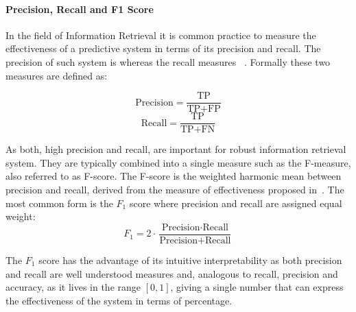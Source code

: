 \cite[Chapter 8.3, p.~155]{Manning:2008aa}

\paragraph{Precision, Recall and F1 Score}
\label{par:Precision, Recall and F1 Score}

In the field of Information Retrieval it is common practice to measure the effectiveness of a predictive system in terms of its precision and recall.
The precision of such system is  whereas the recall measures ~\cite{Rijsbergen:1979aa}. Formally these two measures are defined as:

\begin{equation}
    \text{Precision} = \frac{\text{TP}}{\text{TP} + \text{FP}}
\end{equation}
\begin{equation}
    \text{Recall} = \frac{\text{TP}}{\text{TP} + \text{FN}}
\end{equation}


As both, high precision and recall, are important for robust information retrieval system. They are typically combined into a single measure such as the F-measure, also referred to as F-score. The F-score is the weighted harmonic mean between precision and recall, derived from the measure of effectiveness proposed in~\cite{Rijsbergen:1979aa}. The most common form is the $F_1$ score  where precision and recall are assigned equal weight:
\begin{equation}
  \label{f1measure}
  F_1 = 2 \cdot \frac{\text{Precision} \cdot \text{Recall}}{\text{Precision} + \text{Recall}}
\end{equation}

The $F_1$ score has the advantage of its intuitive interpretability as both precision and recall are well understood measures and, analogous to recall, precision and accuracy, as it lives in the range $[0,1]$, giving a single number that can express the effectiveness of the system in terms of percentage.

